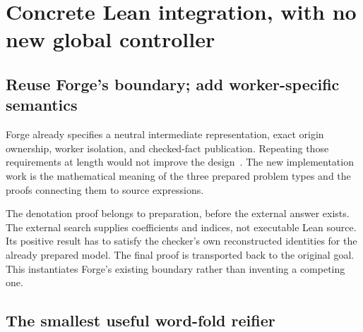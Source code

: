 \section{Concrete Lean integration, with no new global controller}
\label{sec:integration}

\subsection{Reuse Forge's boundary; add worker-specific semantics}

Forge already specifies a neutral intermediate representation, exact origin
ownership, worker isolation, and checked-fact publication. Repeating those
requirements at length would not improve the design~\cite{forge-integration,forge-transfer}.
The new implementation work is the mathematical meaning of the three prepared
problem types and the proofs connecting them to source expressions.

\begin{center}
\end{center}

The denotation proof belongs to preparation, before the external answer exists.
The external search supplies coefficients and indices, not executable Lean
source. Its positive result has to satisfy the checker's own reconstructed
identities for the already prepared model. The final proof is transported back
to the original goal. This instantiates Forge's existing boundary rather than
inventing a competing one.

\subsection{The smallest useful word-fold reifier}

